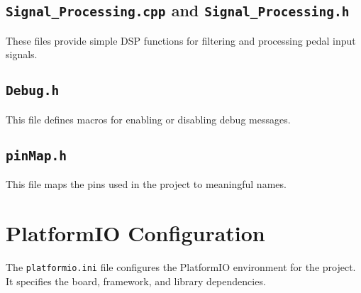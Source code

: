\documentclass[a4paper,12pt]{article}
\begin{document}




\subsection{\texttt{Signal\_Processing.cpp} and \texttt{Signal\_Processing.h}}
These files provide simple DSP functions for filtering and processing pedal input signals.





\subsection{\texttt{Debug.h}}
This file defines macros for enabling or disabling debug messages.



\subsection{\texttt{pinMap.h}}
This file maps the pins used in the project to meaningful names.



\section{PlatformIO Configuration}
The \texttt{platformio.ini} file configures the PlatformIO environment for the project. It specifies the board, framework, and library dependencies.


\end{document}

